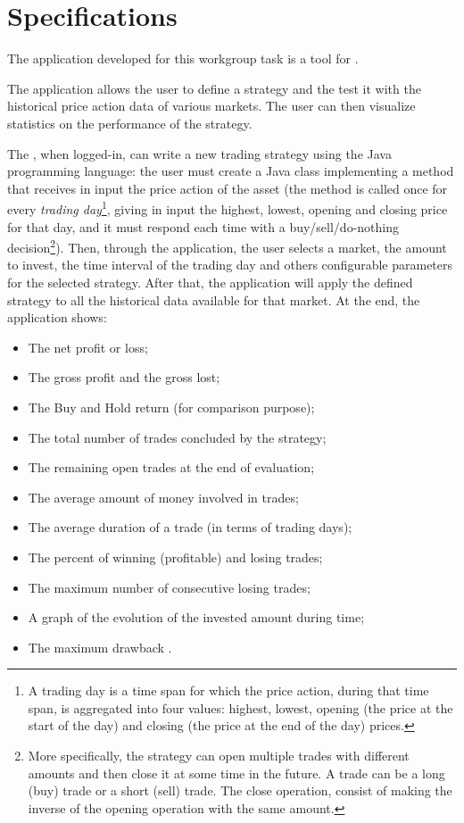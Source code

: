 \chapter{Specifications}\label{ch:specs}

The application developed for this workgroup task is a tool for
.

The application allows the user to define a strategy and the test it with the
historical price action data of various markets. The user can then visualize
statistics on the performance of the strategy.

The , when logged-in, can write a new trading strategy using the
Java programming language: the user must create a Java class implementing a
method that receives in input the price action of the asset (the method is
called once for every \emph{trading day}\footnote{A trading day is a time span
for which the price action, during that time span, is aggregated into four
values: highest, lowest, opening (the price at the start of the day) and closing
(the price at the end of the day) prices.}, giving in input the highest, lowest,
opening and closing price for that day, and it must respond each time with a
buy/sell/do-nothing decision\footnote{More specifically, the strategy can open
multiple trades with different amounts and then close it at some time in the
future. A trade can be a long (buy) trade or a short (sell) trade. The close
operation, consist of making the inverse of the opening operation with the same
amount.}). Then, through the application, the user selects a market, the amount
to invest, the time interval of the trading day and others configurable
parameters for the selected strategy. After that, the application will apply the
defined strategy to all the historical data available for that market. At the
end, the application shows:
\begin{itemize}
	\item The net profit or loss;
	\item The gross profit  and the gross lost;
	\item The Buy and Hold return (for comparison purpose);
	\item The total number of trades concluded by the strategy;
	\item The remaining open trades at the end of evaluation;
	\item The average amount of money involved in trades;
	\item The average duration of a trade (in terms of trading days);
	\item The percent of winning (profitable) and losing trades;
	\item The maximum number of consecutive losing trades;
	\item A graph of the evolution of the invested amount during time;
	\item The maximum drawback .
\end{itemize}


